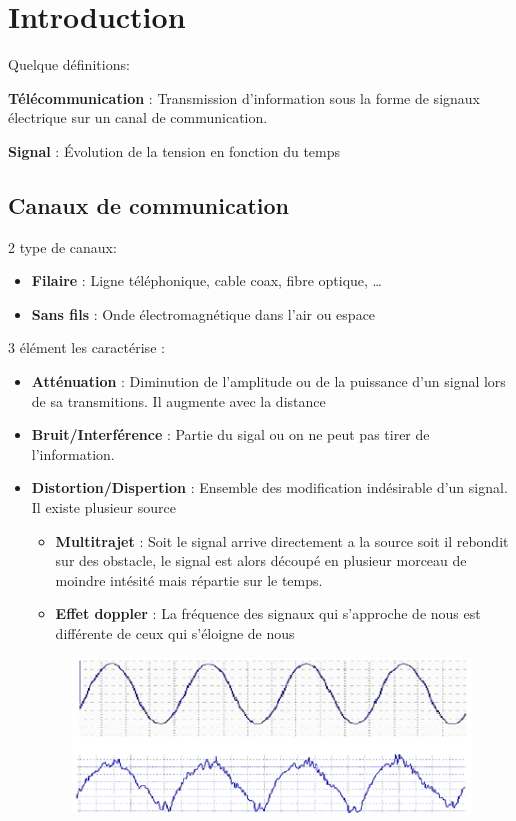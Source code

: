 \section{Introduction}
Quelque définitions:

\textbf{Télécommunication} : Transmission d'information sous la forme de signaux électrique sur un canal de communication.

\textbf{Signal} : Évolution de la tension en fonction du temps

	\subsection{Canaux de communication}
		2 type de canaux:
		\begin{itemize}
			\item \textbf{Filaire} : Ligne téléphonique, cable coax, fibre optique, \dots
			\item \textbf{Sans fils} : Onde électromagnétique dans l'air ou espace
		\end{itemize}
		
		3 élément les caractérise :
		\begin{itemize}
			\item \textbf{Atténuation} : Diminution de l'amplitude ou de la puissance d'un signal lors de sa transmitions. Il augmente avec la distance
			\item \textbf{Bruit/Interférence} : Partie du sigal ou on ne peut pas tirer de l'information.
			\item  \textbf{Distortion/Dispertion} : Ensemble des modification indésirable d'un signal. Il existe plusieur source
			\begin{itemize}
				\item \textbf{Multitrajet} : Soit le signal arrive directement a la source soit il rebondit sur des obstacle, le signal est alors découpé en plusieur morceau de moindre intésité mais répartie sur le temps.
				\item \textbf{Effet doppler} : La fréquence des signaux qui s'approche de nous est  différente de ceux qui s'éloigne de nous
			\end{itemize}
			
			\begin{figure}[htp]
				\centering
				\includegraphics[width=\textwidth]{img/Distortion.png}
			\end{figure}
		\end{itemize}
	
